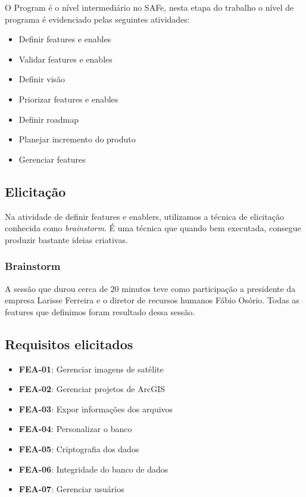   O Program é o nível intermediário no SAFe, nesta etapa do trabalho o nível de programa é evidenciado pelas seguintes atividades:

  \begin{itemize}
    \item Definir features e enables
    \item Validar features e enables
    \item Definir visão
    \item Priorizar features e enables
    \item Definir roadmap
    \item Planejar incremento do produto
    \item Gerenciar features
  \end{itemize}

\subsection{Elicitação}
  Na atividade de definir features e enablers, utilizamos a técnica de elicitação conhecida como \textit{brainstorm}. É uma técnica que quando bem executada, consegue produzir bastante ideias criativas.
\subsubsection{Brainstorm}
  A sessão que durou cerca de 20 minutos teve como participação a presidente da empresa Larisse Ferreira e o diretor de recursos humanos Fábio Osório. Todas as features que definimos foram resultado dessa sessão.

\subsection{Requisitos elicitados}

  \begin{itemize}
    \item \textbf{FEA-01}: Gerenciar imagens de satélite
    \item \textbf{FEA-02}: Gerenciar projetos de ArcGIS
    \item \textbf{FEA-03}: Expor informações dos arquivos
    \item \textbf{FEA-04}: Personalizar o banco
    \item \textbf{FEA-05}: Criptografia dos dados
    \item \textbf{FEA-06}: Integridade do banco de dados
    \item \textbf{FEA-07}: Gerenciar usuários
  \end{itemize}

